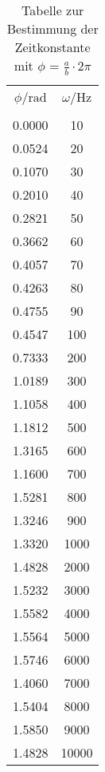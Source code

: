 \begin{table}[H]
  \centering
  \caption{Tabelle zur Bestimmung der Zeitkonstante mit $\phi$ = $\frac{a}{b} \cdot 2\pi$}
    \begin{tabular}{c c}
      \toprule \\
      $\phi / \text{rad}$ & $\omega / \text{Hz}$&  \\
      \midrule \\
       0.0000 &    10 \\
       0.0524 &    20 \\
       0.1070 &    30 \\
       0.2010 &    40 \\
       0.2821 &    50 \\
       0.3662 &    60 \\
       0.4057 &    70 \\
       0.4263 &    80 \\
       0.4755 &    90 \\
       0.4547 &    100 \\
       0.7333 &    200 \\
       1.0189 &    300 \\
       1.1058 &    400 \\
       1.1812 &    500 \\
       1.3165 &    600 \\
       1.1600 &    700 \\
       1.5281 &    800 \\
       1.3246 &    900 \\
       1.3320 &    1000 \\
       1.4828 &    2000 \\
       1.5232 &    3000 \\
       1.5582 &    4000 \\
       1.5564 &    5000 \\
       1.5746 &    6000 \\
       1.4060 &    7000 \\
       1.5404 &    8000 \\
       1.5850 &    9000 \\
       1.4828 &    10000 \\
      \bottomrule
    \end{tabular}
    \label{tab:3}
  \end{table}
